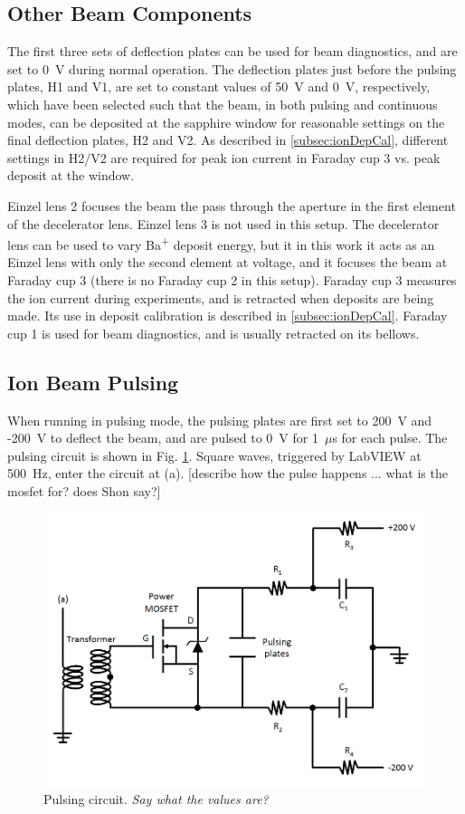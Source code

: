 \subsection{Other Beam Components}

The first three sets of deflection plates can be used for beam diagnostics, and are set to 0~V during normal operation.  The deflection plates just before the pulsing plates, H1 and V1, are set to constant values of 50~V and 0~V, respectively, which have been selected such that the beam, in both pulsing and continuous modes, can be deposited at the sapphire window for reasonable settings on the final deflection plates, H2 and V2.  As described in \ref{subsec:ionDepCal}, different settings in H2/V2 are required for peak ion current in Faraday cup 3 vs. peak deposit at the window.

Einzel lens 2 focuses the beam the pass through the aperture in the first element of the decelerator lens.  Einzel lens 3 is not used in this setup.  The decelerator lens can be used to vary Ba\textsuperscript{+} deposit energy, but it in this work it acts as an Einzel lens with only the second element at voltage, and it focuses the beam at Faraday cup 3 (there is no Faraday cup 2 in this setup).  Faraday cup 3 measures the ion current during experiments, and is retracted when deposits are being made.  Its use in deposit calibration is described in \ref{subsec:ionDepCal}.  Faraday cup 1 is used for beam diagnostics, and is usually retracted on its bellows.  

\subsection{Ion Beam Pulsing}

When running in pulsing mode, the pulsing plates are first set to 200~V and -200~V to deflect the beam, and are pulsed to 0~V for 1~$\mu$s for each pulse.  The pulsing circuit is shown in Fig. \ref{fig:pulse_circuit}.  Square waves, triggered by LabVIEW at 500~Hz, enter the circuit at (a). {\color{red}[describe how the pulse happens ... what is the mosfet for?  does Shon say?]}


\begin{figure} %
        \centering
                \includegraphics[width=.85\textwidth]{figures/pulsing_circuit.png}
                \caption{Pulsing circuit.  \emph{\color{red}Say what the values are?} \cite{Shon}}
\label{fig:pulse_circuit}
\end{figure}


